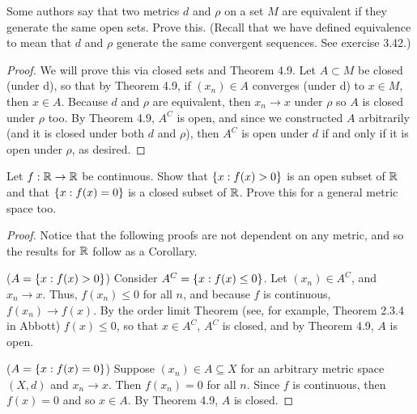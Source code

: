 \begin{exercise}{3}
Some authors say that two metrics $d$ and $\rho$ on a set $M$ are equivalent if they generate the same open sets. 
Prove this. (Recall that we have defined equivalence to mean that $d$ and $\rho$ generate the same convergent sequences. 
See exercise 3.42.)
\end{exercise}
\begin{proof}
We will prove this via closed sets and Theorem 4.9. 
Let $A\subset M$ be closed (under d), so that by Theorem 4.9, if $(x_n)\in A$ converges (under d) to $x\in M$, then $x\in A$. 
Because $d$ and $\rho$ are equivalent, then $x_n\to x$ under $\rho$ so $A$ is closed under $\rho$ too. 
By Theorem 4.9, $A^C$ is open, and since we constructed $A$ arbitrarily (and it is closed under both $d$ and $\rho$), then $A^C$ is open under $d$ if and only if it is open under $\rho$, as desired.
\end{proof} 

\begin{exercise}{5}
Let $f:\mathbb{R}\to\mathbb{R}$ be continuous. 
Show that $\{x:f(x)>0\}$ is an open subset of $\mathbb{R}$ and that $\{x:f(x)=0\}$ is a closed subset of $\mathbb{R}$. 
Prove this for a general metric space too.
\end{exercise}
\begin{proof}
Notice that the following proofs are not dependent on any metric, and so the results for $\mathbb{R}$ follow as a Corollary.

($A=\{x:f(x)>0\}$) 
Consider $A^C=\{x:f(x)\leq 0\}$. 
Let $(x_n)\in A^C$, and $x_n\to x$. 
Thus, $f(x_n)\leq 0$ for all $n$, and because $f$ is continuous, $f(x_n)\to f(x)$. 
By the order limit Theorem (see, for example, Theorem 2.3.4 in Abbott) $f(x)\leq 0$, so that $x\in A^C$, $A^C$ is closed, and by Theorem 4.9, $A$ is open.

($A=\{x:f(x)=0\}$) 
Suppose $(x_n)\in A\subseteq X$ for an arbitrary metric space $(X,d)$ and $x_n\to x$. 
Then $f(x_n)=0$ for all $n$. 
Since $f$ is continuous, then $f(x)=0$ and so $x\in A$. 
By Theorem 4.9, $A$ is closed.
\end{proof} 

